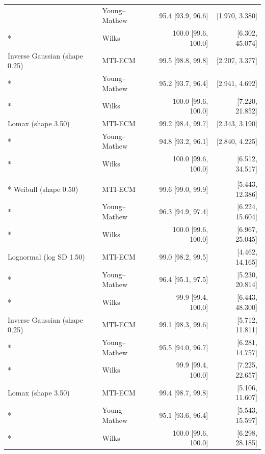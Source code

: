 \begin{longtable}{@{}llrr@{}}
 & Young--Mathew & 95.4 [93.9, 96.6] & [1.970, 3.380] \\*
 & Wilks & 100.0 [99.6, 100.0] & [6.302, 45.074] \\
Inverse Gaussian (shape 0.25) & MTI-ECM & 99.5 [98.8, 99.8] & [2.207, 3.377] \\*
 & Young--Mathew & 95.2 [93.7, 96.4] & [2.941, 4.692] \\*
 & Wilks & 100.0 [99.6, 100.0] & [7.220, 21.852] \\
Lomax (shape 3.50) & MTI-ECM & 99.2 [98.4, 99.7] & [2.343, 3.190] \\*
 & Young--Mathew & 94.8 [93.2, 96.1] & [2.840, 4.225] \\*
 & Wilks & 100.0 [99.6, 100.0] & [6.512, 34.517] \\
\addlinespace[0.4em]
\multicolumn{4}{l}{\textbf{\(n=1000, c=0.99, p=0.95\)}} \\*
Weibull (shape 0.50) & MTI-ECM & 99.6 [99.0, 99.9] & [5.443, 12.386] \\*
 & Young--Mathew & 96.3 [94.9, 97.4] & [6.224, 15.604] \\*
 & Wilks & 100.0 [99.6, 100.0] & [6.967, 25.045] \\
Lognormal (log SD 1.50) & MTI-ECM & 99.0 [98.2, 99.5] & [4.462, 14.165] \\*
 & Young--Mathew & 96.4 [95.1, 97.5] & [5.230, 20.814] \\*
 & Wilks & 99.9 [99.4, 100.0] & [6.443, 48.300] \\
Inverse Gaussian (shape 0.25) & MTI-ECM & 99.1 [98.3, 99.6] & [5.712, 11.811] \\*
 & Young--Mathew & 95.5 [94.0, 96.7] & [6.281, 14.757] \\*
 & Wilks & 99.9 [99.4, 100.0] & [7.225, 22.657] \\
Lomax (shape 3.50) & MTI-ECM & 99.4 [98.7, 99.8] & [5.106, 11.607] \\*
 & Young--Mathew & 95.1 [93.6, 96.4] & [5.543, 15.597] \\*
 & Wilks & 100.0 [99.6, 100.0] & [6.298, 28.185] \\
\bottomrule
\end{longtable}
